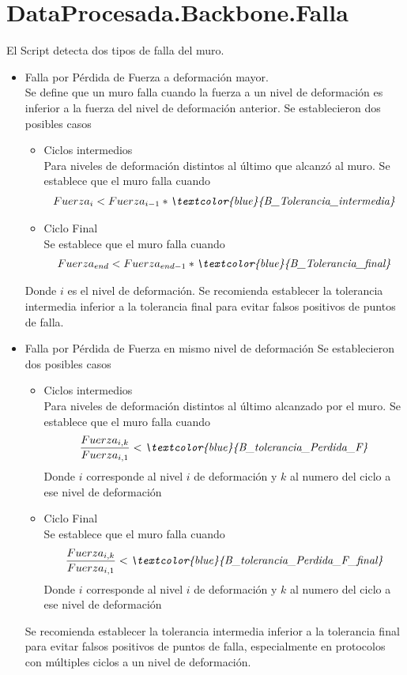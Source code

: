 \documentclass[a4paper, 11pt,article,oneside]{memoir}%
\begin{document}
\section{DataProcesada.Backbone.Falla}
El Script  detecta  dos tipos de falla del muro. 
\begin{itemize}
    \item Falla por Pérdida de Fuerza a deformación mayor.\\
    Se define que un muro falla cuando la fuerza a un nivel de deformación es inferior a la fuerza  del nivel de deformación anterior.
    Se establecieron dos posibles casos
    \begin{itemize}
        \item Ciclos intermedios\\
        Para niveles de deformación distintos al  último que alcanzó al muro. Se establece que el muro falla cuando 
        \begin{align*}
            Fuerza_{i}<Fuerza_{i-1}*\textit{\textcolor{blue}{B\_Tolerancia\_intermedia}}
        \end{align*}
        \item Ciclo Final\\
        Se establece que el muro falla cuando 
        \begin{align*}
            Fuerza_{end}<Fuerza_{end-1}*\textit{\textcolor{blue}{B\_Tolerancia\_final}}
        \end{align*}
    \end{itemize}
    Donde $i$ es el nivel de deformación.
    Se recomienda establecer la tolerancia intermedia inferior a la tolerancia final para evitar falsos positivos de puntos de falla.
    \item Falla por Pérdida de Fuerza en mismo nivel de deformación
    Se establecieron dos posibles casos
    \begin{itemize}
        \item Ciclos intermedios\\
        Para niveles de deformación distintos al último alcanzado por el muro. Se establece que el muro falla cuando 
        \begin{align*}
            \frac{Fuerza_{i,k}}{Fuerza_{i,1}}< \textit{\textcolor{blue}{B\_tolerancia\_Perdida\_F}}
        \end{align*}
        Donde $i$ corresponde al nivel $i$ de deformación y $k$ al numero del ciclo a ese nivel de deformación 
        \item Ciclo Final\\
        Se establece que el muro falla cuando 
        \begin{align*}
            \frac{Fuerza_{i,k}}{Fuerza_{i,1}}< \textit{\textcolor{blue}{B\_tolerancia\_Perdida\_F\_final}}
        \end{align*}
        Donde $i$ corresponde al nivel $i$ de deformación y $k$ al numero del ciclo a ese nivel de deformación 
    \end{itemize}
    Se recomienda establecer la tolerancia intermedia inferior a la tolerancia final para evitar falsos positivos de puntos de falla, especialmente en protocolos con múltiples ciclos a un nivel de deformación.
\end{itemize}
\end{document}
